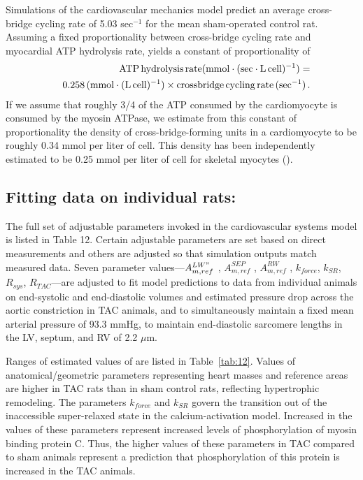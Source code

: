 \documentclass[fleqn,10pt]{physiome}
\begin{document}
Simulations of the cardiovascular mechanics model predict an average cross-bridge cycling rate of 5.03 sec$^{-1}$ for the mean sham-operated control rat. Assuming a fixed proportionality between cross-bridge cycling rate and myocardial ATP hydrolysis rate, yields a constant of proportionality of 
\begin{eqnarray}
 & & {\rm ATP\, hydrolysis\, rate (mmol\cdot(sec \cdot L \, cell)^{-1})}  = \nonumber \\
 & & {\rm 0.258 \, (mmol \cdot (L \, cell)^{-1}) \times crossbridge \, cycling \,rate \, (sec^{-1}) } \, .
\end{eqnarray}
If we assume that roughly 3/4 of the ATP consumed by the cardiomyocyte is consumed by the myosin ATPase, we estimate from this constant of proportionality the density of cross-bridge-forming units in a cardiomyocyte to be roughly 0.34 mmol per liter of cell. This density has been independently estimated to be 0.25 mmol per liter of cell for skeletal myocytes (\cite{Barclay2010}).

\subsection{Fitting data on individual rats:}

The full set of adjustable parameters invoked in the cardiovascular systems model is listed in Table 12. Certain adjustable parameters are set based on direct measurements and others are adjusted so that simulation outputs match measured data. Seven parameter values---$A_{m,ref}^{LW"}$ , $A_{m,ref} ^{SEP}$ , $A_{m,ref}^{RW}$ , $k_{force}$, $k_{SR}$, $R_{sys}$, $R_{TAC}$---are adjusted to fit model predictions to data from individual animals on end-systolic and end-diastolic volumes and estimated pressure drop across the aortic constriction in TAC animals, and to simultaneously maintain a fixed mean arterial pressure of 93.3 mmHg, to maintain end-diastolic sarcomere lengths in the LV, septum, and RV of 2.2 $\mu$m. 

Ranges of estimated values of are listed in Table~\ref{tab:12}. Values of anatomical/geometric parameters representing heart masses and reference areas are higher in TAC rats than in sham control rats, reflecting hypertrophic remodeling.
The parameters $k_{force}$ and $k_{SR}$ govern the transition out of the inaccessible super-relaxed state in the calcium-activation model. Increased in the values of these parameters represent increased levels of phosphorylation of myosin binding protein C. Thus, the higher values of these parameters in TAC compared to sham animals represent a prediction that phosphorylation of this protein is increased in the TAC animals.
\end{document}
